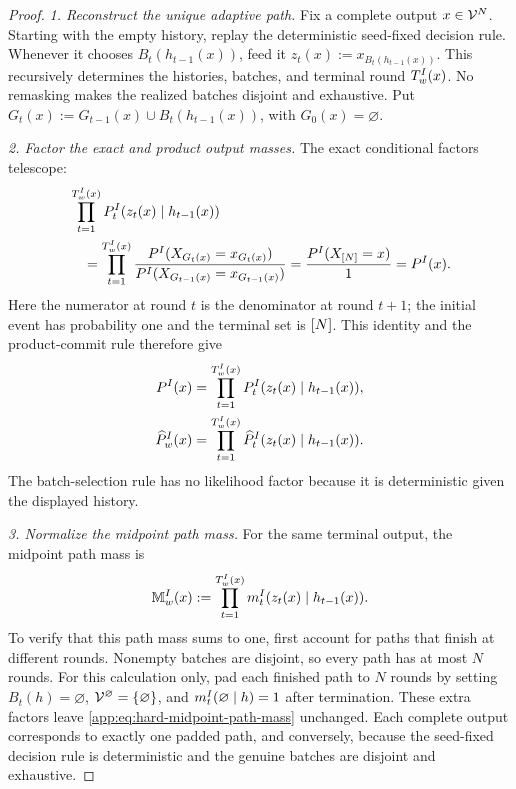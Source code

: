 \begin{proof}

\emph{1. Reconstruct the unique adaptive path.}
Fix a complete output \(x\in\Vocab^N\).  Starting with the empty history,
replay the deterministic seed-fixed decision rule.  Whenever it chooses
\(B_t(h_{t-1}(x))\), feed it
\(z_t(x):=x_{B_t(h_{t-1}(x))}\).  This recursively determines the histories,
batches, and terminal round \(\HardTerminalRoundCount{I}{w}{x}\).  No
remasking makes the realized batches disjoint and exhaustive.  Put
\(G_t(x):=G_{t-1}(x)\cup B_t(h_{t-1}(x))\), with \(G_0(x)=\varnothing\).

\emph{2. Factor the exact and product output masses.}
The exact conditional factors telescope:
\begin{align*}
 &\prod_{t=1}^{\HardTerminalRoundCount{I}{w}{x}}
   \HardExactBatchLaw{t}{I}(z_t(x)\mid h_{t-1}(x))\\
 &\quad=\prod_{t=1}^{\HardTerminalRoundCount{I}{w}{x}}
   \frac{\HardTargetLaw{I}(X_{G_t(x)}=x_{G_t(x)})}
        {\HardTargetLaw{I}(X_{G_{t-1}(x)}=x_{G_{t-1}(x)})}
 =\frac{\HardTargetLaw{I}(X_{\PositionSet}=x)}{1}
 =\HardTargetLaw{I}(x).
\end{align*}
Here the numerator at round \(t\) is the denominator at round \(t+1\);
the initial event has probability one and the terminal set is \(\PositionSet\).
This identity and the
product-commit rule therefore give
\begin{align}
 \HardTargetLaw{I}(x)
 &=\prod_{t=1}^{\HardTerminalRoundCount{I}{w}{x}}
   \HardExactBatchLaw{t}{I}
    (z_t(x)\mid h_{t-1}(x)),
 \label{app:eq:hard-exact-path-factorization}\\
 \HardOutputLaw{I}{w}(x)
 &=\prod_{t=1}^{\HardTerminalRoundCount{I}{w}{x}}
   \HardProductBatchLaw{t}{I}
    (z_t(x)\mid h_{t-1}(x)).
 \label{app:eq:hard-product-path-factorization}
\end{align}
The batch-selection rule has no likelihood factor because it is deterministic
given the displayed history.


\emph{3. Normalize the midpoint path mass.}
For the same terminal output, the midpoint path mass is
\begin{equation}
 \HardMidpointLaw{I}{w}(x)
 :=\prod_{t=1}^{\HardTerminalRoundCount{I}{w}{x}}
   \HardMidpointKernel{t}{I}
    (z_t(x)\mid h_{t-1}(x)).
 \label{app:eq:hard-midpoint-path-mass}
\end{equation}
To verify that this path mass sums to one, first account for paths that
finish at different rounds.  Nonempty batches are disjoint, so every path
has at most \(N\) rounds.  For this calculation only, pad each finished path
to \(N\) rounds by setting \(B_t(h)=\varnothing\),
\(\Vocab^\varnothing=\{\varnothing\}\), and
\(\HardMidpointKernel{t}{I}(\varnothing\mid h)=1\) after termination.
These extra factors leave \eqref{app:eq:hard-midpoint-path-mass} unchanged.
Each complete output corresponds to exactly one padded path, and conversely,
because the seed-fixed decision rule is deterministic and the genuine batches
are disjoint and exhaustive.


\end{proof}
